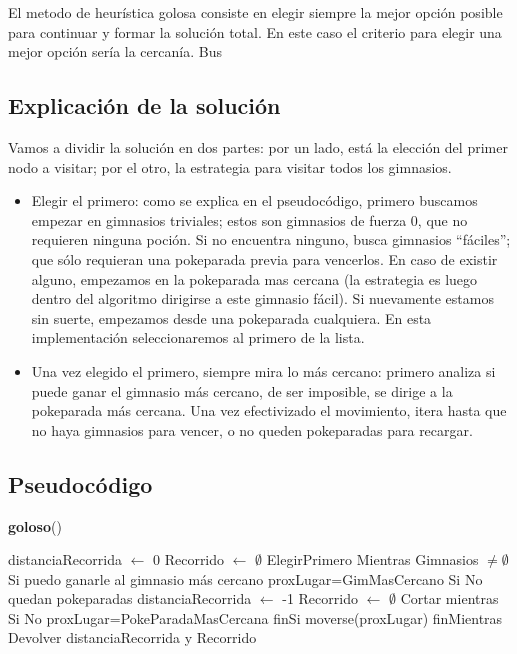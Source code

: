 \documentclass[spanish,12pt]{article}
\begin{document}
El metodo de heurística golosa consiste en elegir siempre la mejor opción posible para continuar y formar la solución total. En este caso el criterio para elegir una mejor opción sería la cercanía. Bus


\subsection{Explicación de la solución}
Vamos a dividir la solución en dos partes: por un lado, está la elección del primer nodo a visitar; por el otro, la estrategia para visitar todos los gimnasios.

\begin{itemize}
	\item Elegir el primero: como se explica en el pseudocódigo, primero buscamos empezar en gimnasios triviales; estos son gimnasios de fuerza 0, que no requieren ninguna poción. Si no encuentra ninguno, busca gimnasios ``fáciles''; que sólo requieran una pokeparada previa para vencerlos. En caso de existir alguno, empezamos en la pokeparada mas cercana (la estrategia es luego dentro del algoritmo dirigirse a este gimnasio fácil). Si nuevamente estamos sin suerte, empezamos desde una pokeparada cualquiera. En esta implementación seleccionaremos al primero de la lista.
	\item Una vez elegido el primero, siempre mira lo más cercano: primero analiza si puede ganar el gimnasio más cercano, de ser imposible, se dirige a la pokeparada más cercana. Una vez efectivizado el movimiento, itera hasta que no haya gimnasios para vencer, o no queden pokeparadas para recargar.
	
\end{itemize} 




\subsection{Pseudocódigo}

\begin{algorithm}[H]{\textbf{goloso}()}
	\begin{algorithmic}[1]
		\State distanciaRecorrida $\gets$ 0
		\State Recorrido $\gets$ $\emptyset$
		\State ElegirPrimero
		\State Mientras Gimnasios $\not= \emptyset$
		\State \quad Si puedo ganarle al gimnasio más cercano
		\State \qquad proxLugar=GimMasCercano
		\State \quad Si No quedan pokeparadas 
		\State \qquad distanciaRecorrida $\gets$ -1
		\State \qquad Recorrido $\gets$ $\emptyset$
		\State \qquad Cortar mientras
		\State \quad Si No
		\State \qquad proxLugar=PokeParadaMasCercana
		\State \quad finSi
		\State \quad moverse(proxLugar)
		\State finMientras
		\State Devolver distanciaRecorrida y Recorrido 
	\end{algorithmic}
\end{algorithm}
\end{document}
